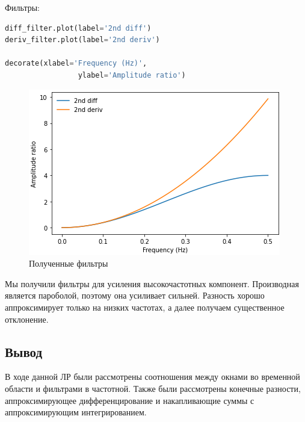 Фильтры:
\begin{lstlisting}[language=Python]
diff_filter.plot(label='2nd diff')
deriv_filter.plot(label='2nd deriv')

decorate(xlabel='Frequency (Hz)',
                 ylabel='Amplitude ratio')
\end{lstlisting}

\begin{figure}[H]
	\begin{center}
		\includegraphics[scale=1]{fig/lab09/lab9_16.png}
		\caption{Полученные фильтры}
	\end{center}
\end{figure}

Мы получили фильтры для усиления высокочастотных компонент. Производная является пароболой, поэтому она усиливает сильней. Разность хорошо аппроксимирует только на низких частотах, а далее получаем существенное отклонение.

\subsection{Вывод}

В ходе данной ЛР были рассмотрены соотношения между окнами во временной области и фильтрами в частотной. Также были рассмотрены конечные разности, аппроксимирующее дифференцирование и накапливающие суммы с аппроксимирующим интегрированием.